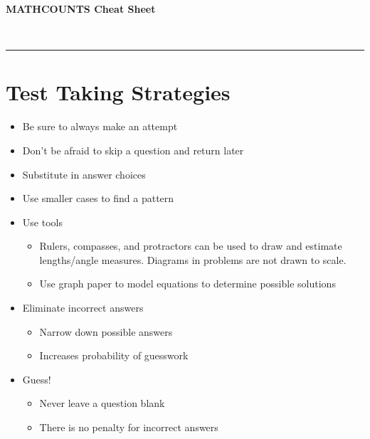 \documentclass[11pt,letterpaper]{article}
\begin{document}
\begin{minipage}{\textwidth}
     \begin{center}
          \textbf{\huge MATHCOUNTS Cheat Sheet}
          \vspace{0.1in}
     \end{center}
\end{minipage} \\
\rule[2ex]{\textwidth}{2pt} 
\centering
\begin{minipage}{\textwidth}
     \section*{Test Taking Strategies}
     \begin{itemize}
          \item Be sure to always make an attempt
          \item Don't be afraid to skip a question and return later
          \item Substitute in answer choices
          \item Use smaller cases to find a pattern
          \item Use tools
          \begin{itemize}
               \item Rulers, compasses, and protractors can be used to draw and estimate lengths/angle measures. Diagrams in problems are not drawn to scale.
               \item Use graph paper to model equations to determine possible solutions
          \end{itemize}
          \item Eliminate incorrect answers
          \begin{itemize}
               \item Narrow down possible answers
               \item Increases probability of guesswork
          \end{itemize}
          \item Guess! 
          \begin{itemize}
               \item Never leave a question blank
               \item There is no penalty for incorrect answers
          \end{itemize}
     \end{itemize}
     \vspace{0.5cm}
\end{minipage}
\end{document}
